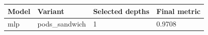 \begin{tabular}{llll}
\hline
Model & Variant & Selected depths & Final metric \\
\hline
mlp & pods\_sandwich & 1 & 0.9708 \\
\hline
\end{tabular}
